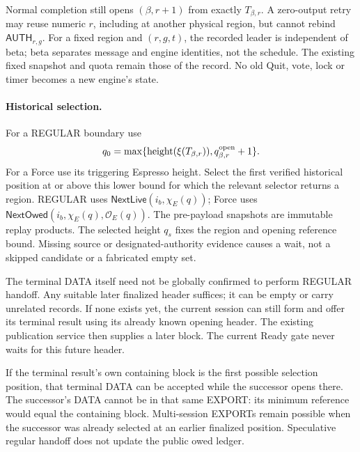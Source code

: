 \documentclass[11pt,a4paper]{article}
\newcommand{\tagg}[1]{\ensuremath{\mathsf{#1}}}
\begin{document}
Normal completion still opens $(\beta,r+1)$ from exactly
$T_{\beta,r}$. A zero-output retry may reuse numeric $r$, including at
another physical region, but cannot rebind $\tagg{AUTH}_{r,g}$.
For a fixed region and $(r,g,t)$, the recorded leader is independent
of beta; beta separates message and engine identities, not the schedule.
The existing fixed snapshot and quota remain those of the record.
No old Quit, vote, lock or timer becomes a new engine's state.

\paragraph{Historical selection.}
For a REGULAR boundary use
\[
 q_0=\max\{\operatorname{height}(\xi(T_{\beta,r})),
                         q^{\rm open}_{\beta,r}+1\}.
\]
For a Force use its triggering Espresso height. Select the first
verified historical position at or above this lower bound for which
the relevant selector returns a region. REGULAR uses
$\tagg{NextLive}(i_b,\chi_E(q))$; Force uses
$\tagg{NextOwed}(i_b,\chi_E(q),\mathcal O_E(q))$.
The pre-payload snapshots are immutable replay products. The selected
height $q_s$ fixes the region and opening reference bound. Missing
source or designated-authority evidence causes a wait, not a skipped
candidate or a fabricated empty set.

The terminal DATA itself need not be globally confirmed to perform
REGULAR handoff. Any suitable later finalized header suffices; it can
be empty or carry unrelated records. If none exists yet, the current
session can still form and offer its terminal result using its already
known opening header. The existing publication service then supplies
a later block. The current Ready gate never waits for this future header.

If the terminal result's own containing block is the first possible
selection position, that terminal DATA can be accepted while the
successor opens there. The successor's DATA cannot be in that same
EXPORT: its minimum reference would equal the containing block.
Multi-session EXPORTs remain possible when the successor was already
selected at an earlier finalized position. Speculative regular handoff
does not update the public owed ledger.
\end{document}

